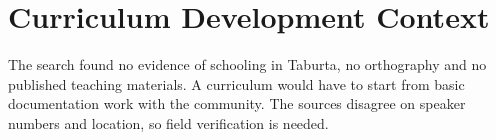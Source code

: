 \documentclass[12pt]{article}
\begin{document}
\section{Curriculum Development Context}
The search found no evidence of schooling in Taburta, no orthography and no published teaching materials. A curriculum would have to start from basic documentation work with the community. The sources disagree on speaker numbers and location, so field verification is needed.
\end{document}
